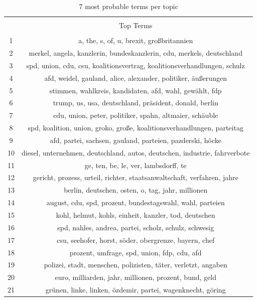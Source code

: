 \documentclass[
  12pt,
]{article}
\begin{document}
\begin{table}[!htbp] \centering 
  \caption{7 most probable terms per topic} 
  \label{table:top_terms} 
\begin{tabular}{@{\extracolsep{5pt}} cc} 
\\[-1.8ex]\hline 
\hline \\[-1.8ex] 
 & Top Terms \\ 
\hline \\[-1.8ex] 
1 & a, the, s, of, u, brexit, großbritannien \\ 
2 & merkel, angela, kanzlerin, bundeskanzlerin, cdu, merkels, deutschland \\ 
3 & spd, union, cdu, csu, koalitionsvertrag, koalitionsverhandlungen, schulz \\ 
4 & afd, weidel, gauland, alice, alexander, politiker, äußerungen \\ 
5 & stimmen, wahlkreis, kandidaten, afd, wahl, gewählt, fdp \\ 
6 & trump, us, usa, deutschland, präsident, donald, berlin \\ 
7 & cdu, union, peter, politiker, spahn, altmaier, schäuble \\ 
8 & spd, koalition, union, groko, große, koalitionsverhandlungen, parteitag \\ 
9 & afd, partei, sachsen, gauland, parteien, pazderski, höcke \\ 
10 & diesel, unternehmen, deutschland, autos, deutschen, industrie, fahrverbote \\ 
11 & ge, ten, be, le, ver, lambsdorff, te \\ 
12 & gericht, prozess, urteil, richter, staatsanwaltschaft, verfahren, jahre \\ 
13 & berlin, deutschen, osten, o, tag, jahr, millionen \\ 
14 & august, cdu, spd, prozent, bundestagswahl, wahl, parteien \\ 
15 & kohl, helmut, kohls, einheit, kanzler, tod, deutschen \\ 
16 & spd, nahles, andrea, partei, scholz, schulz, schwesig \\ 
17 & csu, seehofer, horst, söder, obergrenze, bayern, chef \\ 
18 & prozent, umfrage, spd, union, fdp, cdu, afd \\ 
19 & polizei, stadt, menschen, polizisten, täter, verletzt, angaben \\ 
20 & euro, milliarden, jahr, millionen, prozent, bund, geld \\ 
21 & grünen, linke, linken, özdemir, partei, wagenknecht, göring \\ 

\end{tabular}
\end{table}
\end{document}
